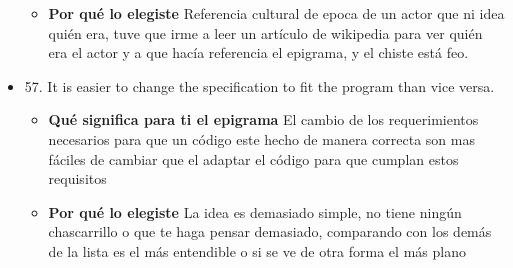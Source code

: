 \documentclass{article}
\begin{document}
\begin{itemize}
\begin{itemize}
            
                
            \item \textbf{ Por qué lo elegiste}
            \newline Referencia cultural de epoca de un actor que ni idea quién era, tuve que irme a leer un artículo de wikipedia para ver quién era el actor y a que hacía referencia el epigrama, y el chiste está feo.
        \end{itemize}
    \item 57. It is easier to change the specification to fit the program than vice versa.
            \begin{itemize}
            \item \textbf{ Qué significa para ti el epigrama} 
                \newline El cambio de los requerimientos necesarios para que un código este hecho de manera correcta son mas fáciles de cambiar que el adaptar el código para que cumplan estos requisitos 
            
                
            \item \textbf{ Por qué lo elegiste}
            \newline La idea es demasiado simple, no tiene ningún chascarrillo o que te haga pensar demasiado, comparando con los demás de la lista es el más entendible o si se ve de otra forma el más plano
        \end{itemize}
\end{itemize}
\end{document}
